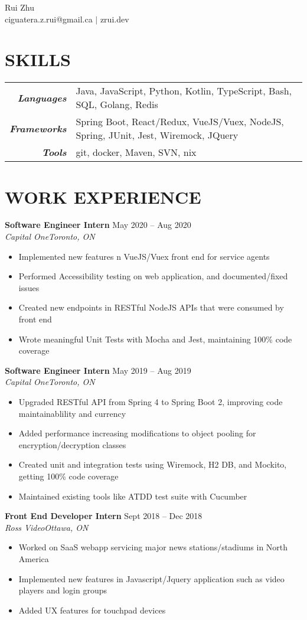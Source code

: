 \documentclass[8pt, letterpaper]{article}
\newcommand{\Header}[2]{\begin{center}
	\Huge\usefont{OT1}{lmss}{s}{n}
		#1 \\
	\small #2 \\
	\normalsize \normalfont
\end{center}}
\newcommand{\SplitEntry}[2]{\textbf{\textit{#1}} & #2\\}
\newcommand{\NewPart}[1]{\section*{\uppercase{\textbf{#1}}}}
\newcommand{\DatedEntry}[5]{\large\textbf{#1}
	\hfill #2\\\normalsize
	\textit{#3}\hfill\textit{#4}\\\vspace{0.10cm}
	#5
}
\begin{document}
\Header{Rui Zhu}{ciguatera.z.rui@gmail.ca $|$ zrui.dev}


\NewPart{Skills}{}
\begin{tabular}{r|l}
	\SplitEntry{Languages}{Java, JavaScript, Python, Kotlin, TypeScript, Bash, SQL, Golang, Redis}
	\SplitEntry{Frameworks}{Spring Boot, React/Redux, VueJS/Vuex, NodeJS, Spring, JUnit, Jest, Wiremock, JQuery}
	\SplitEntry{Tools}{git, docker, Maven, SVN, nix}
\end{tabular}


\NewPart{Work Experience}{}
\DatedEntry{Software Engineer Intern}
{May 2020 -- Aug 2020}
{Capital One}
{Toronto, ON}
{\begin{itemize}[nolistsep]
	\item Implemented new features n VueJS/Vuex front end for service agents 
	\item Performed Accessibility testing on web application, and documented/fixed issues
	\item Created new endpoints in RESTful NodeJS APIs that were consumed by front end
	\item Wrote meaningful Unit Tests with Mocha and Jest, maintaining 100\% code coverage
\end{itemize}}
\DatedEntry{Software Engineer Intern}
{May 2019 -- Aug 2019}
{Capital One}
{Toronto, ON}
{\begin{itemize}[nolistsep]
	\item Upgraded RESTful API from Spring 4 to Spring Boot 2, improving code maintainablility and currency
	\item Added performance increasing modifications to object pooling for encryption/decryption classes
	\item Created unit and integration tests using Wiremock, H2 DB, and Mockito, getting 100\% code coverage
	\item Maintained existing tools like ATDD test suite with Cucumber
\end{itemize}}
\DatedEntry{Front End Developer Intern}
{Sept 2018 -- Dec 2018}
{Ross Video}
{Ottawa, ON}
{\begin{itemize}[nolistsep]
	\item Worked on SaaS webapp servicing major news stations/stadiums in North America
	\item Implemented new features in Javascript/Jquery application such as video players and login groups
	\item Added UX features for touchpad devices
\end{itemize}}
\end{document}
